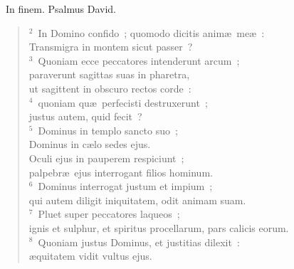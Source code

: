 ~\lettrine[lines=10,image=true,loversize=0.05,lraise=-0.03]{I}{}n finem. Psalmus David.
\begin{flushleft}\begin{verse}\vspace{6pt}${}^{2}$~In Domino confido~; quomodo dicitis anim\ae\ me\ae~:\\ Transmigra in montem sicut passer~?\\
${}^{3}$~Quoniam ecce peccatores intenderunt arcum~;\\ paraverunt sagittas suas in pharetra,\\ ut sagittent in obscuro rectos corde~:\\
${}^{4}$~quoniam qu\ae\ perfecisti destruxerunt~;\\ justus autem, quid fecit~?\\
${}^{5}$~Dominus in templo sancto suo~;\\ Dominus in c\ae lo sedes ejus.\\ Oculi ejus in pauperem respiciunt~;\\ palpebr\ae\ ejus interrogant filios hominum.\\
${}^{6}$~Dominus interrogat justum et impium~;\\ qui autem diligit iniquitatem, odit animam suam.\\
${}^{7}$~Pluet super peccatores laqueos~;\\ ignis et sulphur, et spiritus procellarum, pars calicis eorum.\\
${}^{8}$~Quoniam justus Dominus, et justitias dilexit~:\\ \ae quitatem vidit vultus ejus.\end{verse}\end{flushleft}


